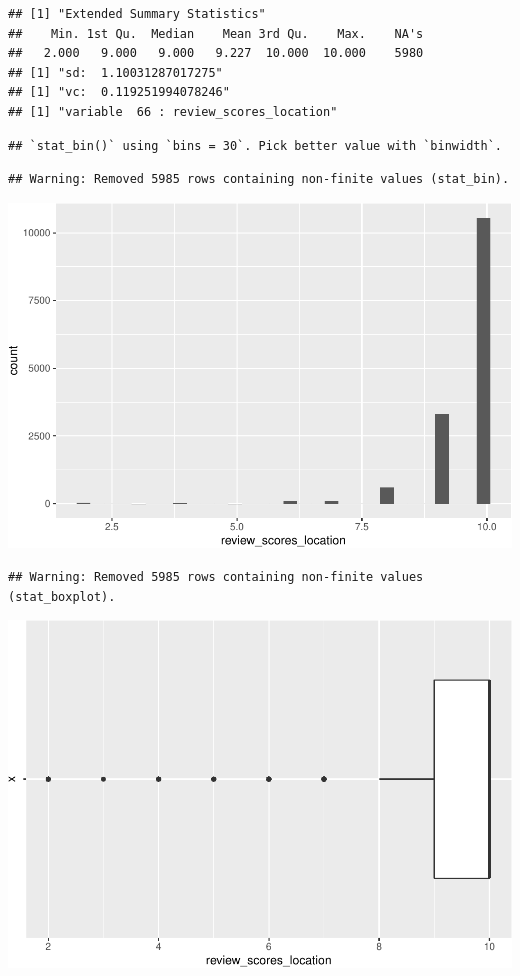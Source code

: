 \begin{verbatim}
## [1] "Extended Summary Statistics"
##    Min. 1st Qu.  Median    Mean 3rd Qu.    Max.    NA's 
##   2.000   9.000   9.000   9.227  10.000  10.000    5980 
## [1] "sd:  1.10031287017275"
## [1] "vc:  0.119251994078246"
## [1] "variable  66 : review_scores_location"
\end{verbatim}

\begin{verbatim}
## `stat_bin()` using `bins = 30`. Pick better value with `binwidth`.
\end{verbatim}

\begin{verbatim}
## Warning: Removed 5985 rows containing non-finite values (stat_bin).
\end{verbatim}

\includegraphics{anal_files/figure-latex/unnamed-chunk-9-48.pdf}

\begin{verbatim}
## Warning: Removed 5985 rows containing non-finite values (stat_boxplot).
\end{verbatim}

\includegraphics{anal_files/figure-latex/unnamed-chunk-9-49.pdf}

